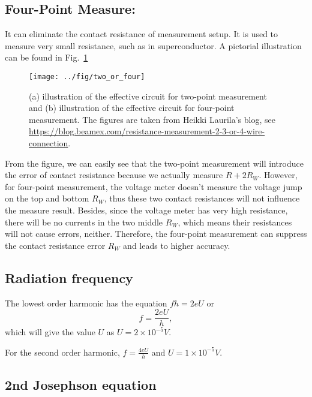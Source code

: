 \subsection{Four-Point Measure:}

It can eliminate the contact resistance of measurement setup. It is
used to measure very small resistance, such as in superconductor.
A pictorial illustration can be found in Fig.\ \ref{two_or_four}

\begin{figure}
\texttt{[image: ../fig/two\_or\_four]}

\caption{(a) illustration of the effective circuit for two-point measurement
and (b) illustration of the effective circuit for four-point measurement.
The figures are taken from Heikki Laurila's blog, see \protect\href{https://blog.beamex.com/resistance-measurement-2-3-or-4-wire-connection}{https://blog.beamex.com/resistance-measurement-2-3-or-4-wire-connection}. }

\label{two_or_four}
\end{figure}
From the figure, we can easily see that the two-point measurement
will introduce the error of contact resistance because we actually
measure $R+2R_{W}$. However, for four-point measurement, the voltage
meter doesn't measure the voltage jump on the top and bottom $R_{W}$,
thus these two contact resistances will not influence the measure
result. Besides, since the voltage meter has very high resistance,
there will be no currents in the two middle $R_{W}$, which means
their resistances will not cause errors, neither. Therefore, the four-point
measurement can suppress the contact resistance error $R_{W}$ and
leads to higher accuracy. 

\subsection{Radiation frequency}

The lowest order harmonic has the equation $fh=2eU$ or 
\begin{equation}
f=\frac{2eU}{h},
\end{equation}
 which will give the value $U$ as $U=2\times10^{-5}V$.

For the second order harmonic, $f=\frac{4eU}{h}$ and $U=1\times10^{-5}V$.

\subsection{2nd Josephson equation}


